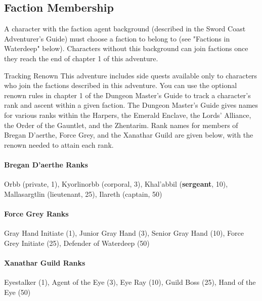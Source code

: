 \documentclass[10pt,a4paper,twoside,twocolumn,openany,nodeprecatedcode]{dndbook}
\begin{document}
\subsection{Faction Membership}
A character with the faction agent background (described in the Sword Coast Adventurer's Guide) must choose a faction to belong to (see "Factions in Waterdeep" below). Characters without this background can join factions once they reach the end of chapter 1 of this adventure.
\begin{DndComment}{Tracking Renown}
This adventure includes side quests available only to characters who join the factions described in this adventure. You can use the optional renown rules in chapter 1 of the Dungeon Master's Guide to track a character's rank and ascent within a given faction. The Dungeon Master's Guide gives names for various ranks within the Harpers, the Emerald Enclave, the Lords' Alliance, the Order of the Gauntlet, and the Zhentarim. Rank names for members of Bregan D'aerthe, Force Grey, and the Xanathar Guild are given below, with the renown needed to attain each rank.
\paragraph{Bregan D'aerthe Ranks}
Orbb (private, 1), Kyorlinorbb (corporal, 3), Khal'abbil (\textbf{sergeant}, 10), Mallasargtlin (lieutenant, 25), Ilareth (captain, 50)
\paragraph{Force Grey Ranks}
Gray Hand Initiate (1), Junior Gray Hand (3), Senior Gray Hand (10), Force Grey Initiate (25), Defender of Waterdeep (50)
\paragraph{Xanathar Guild Ranks}
Eyestalker (1), Agent of the Eye (3), Eye Ray (10), Guild Boss (25), Hand of the Eye (50)
\end{DndComment}
\end{document}
